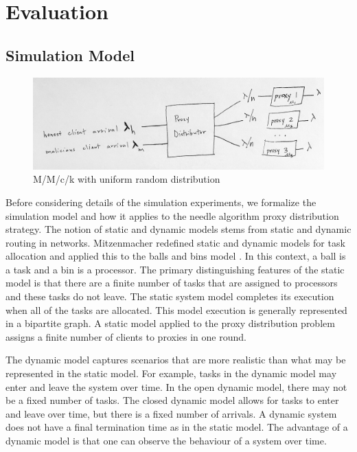 \chapter{Evaluation}
\label{sec:eval}

\section{Simulation Model} 

\begin{figure}[h!]
\centering
     \includegraphics[width=1.0\textwidth]{fig/mmck_queue.png}
    \caption{M/M/c/k with uniform random distribution}

    \label{fig:mmck}
\end{figure}

Before considering details of the simulation experiments, we formalize the simulation model and how it applies to the needle algorithm proxy distribution strategy. The notion of static and dynamic models stems from static and dynamic routing in networks. Mitzenmacher redefined static and dynamic models for task allocation and applied this to the balls and bins model \cite{mitzenmacher1996power}. In this context, a ball is a task and a bin is a processor. The primary distinguishing features of the static model is that there are a finite number of tasks that are assigned to processors and these tasks do not leave. The static system model completes its execution when all of the tasks are allocated. This model execution is generally represented in a bipartite graph. A static model applied to the proxy distribution problem assigns a finite number of clients to proxies in one round.

The dynamic model captures scenarios that are more realistic than what may be represented in the static model. For example, tasks in the dynamic model may enter and leave the system over time. In the open dynamic model, there may not be a fixed number of tasks. The closed dynamic model allows for tasks to enter and leave over time, but there is a fixed number of arrivals. A dynamic system does not have a final termination time as in the static model. The advantage of a dynamic model is that one can observe the behaviour of a system over time.

